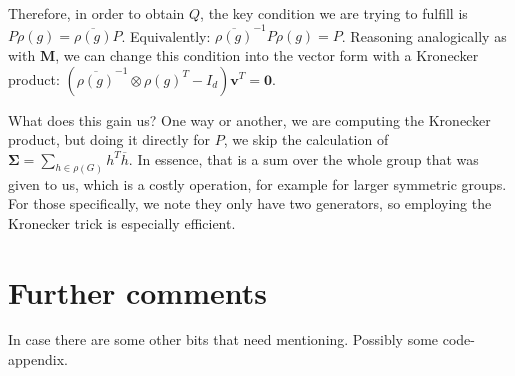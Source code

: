 \documentclass[11pt]{article}
\begin{document}
Therefore, in order to obtain $Q$, the key condition we are trying to
fulfill is $P\rho(g) = \overline{\rho(g)}P$. Equivalently:
$\overline{\rho(g)}^{-1}P\rho(g) = P$. Reasoning analogically as with $\mathbf{M}$,
we can change this condition into the vector form with a Kronecker product:
$\left(\overline{\rho(g)}^{-1} \otimes \rho(g)^T - I_d\right)\mathbf{v}^T = \mathbf{0}$.

What does this gain us? One way or another, we are computing the Kronecker product,
but doing it directly for $P$, we skip the calculation of
$\mathbf{\Sigma} = \sum_{h \in \rho(G)} h^T\overline{h}$. In essence, that is a
sum over the whole group that was given to us, which is a costly operation,
for example for larger symmetric groups. For those specifically, we note they only
have two generators, so employing the Kronecker trick is especially efficient.

\section{Further comments}

In case there are some other bits that need mentioning. Possibly some code-appendix.

\newpage

\printbibliography[title={References}]
\end{document}
